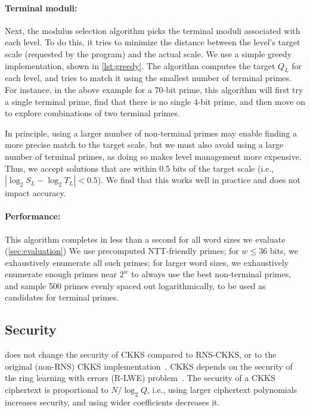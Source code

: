 \paragraph{Terminal moduli:}
Next, the modulus selection algorithm picks the terminal moduli associated with
each level.
To do this, it tries to minimize the distance between the level's target scale
(requested by the program) and the actual scale.
We use a simple greedy implementation, shown in \autoref{lst:greedy}.
The algorithm computes the target $Q_L$ for each level, and tries to match it
using the smallest number of terminal primes.
For instance, in the above example for a 70-bit prime, this algorithm will
first try a single terminal prime, find that there is no single 4-bit prime,
and then move on to explore combinations of two terminal primes.



In principle, using a larger number of non-terminal primes may enable finding a
more precise match to the target scale, but we must also avoid using a large
number of terminal primes, as doing so makes level management more expensive.
Thus, we accept solutions that are within 0.5 bits of the target scale (i.e.,
$|\log_2 S_L - \log_2 T_L| < 0.5$).
We find that this works well in practice and does not impact accuracy.

\paragraph{Performance:}
This algorithm completes in less than a second for all word sizes we evaluate
(\autoref{sec:evaluation})
We use precomputed NTT-friendly primes; for $w \leq 36$ bits, we exhaustively
enumerate all such primes; for larger word sizes, we exhaustively enumerate
enough primes near $2^w$ to always use the best non-terminal primes, and sample
500 primes evenly spaced out logarithmically, to be used as candidates for terminal primes.


\subsection{Security}
\label{sec:security}

\name does not change the security of CKKS compared to RNS-CKKS, or to the
original (non-RNS) CKKS implementation~\cite{cheon:asiacrypt17:ckks}.
CKKS depends on the security of the ring learning with errors (R-LWE)
problem~\cite{brakerski2011fully}.
The security of a CKKS ciphertext is proportional to $N / \log_2Q$, i.e., using
larger ciphertext polynomials increases security, and using wider coefficients
decreases it.


